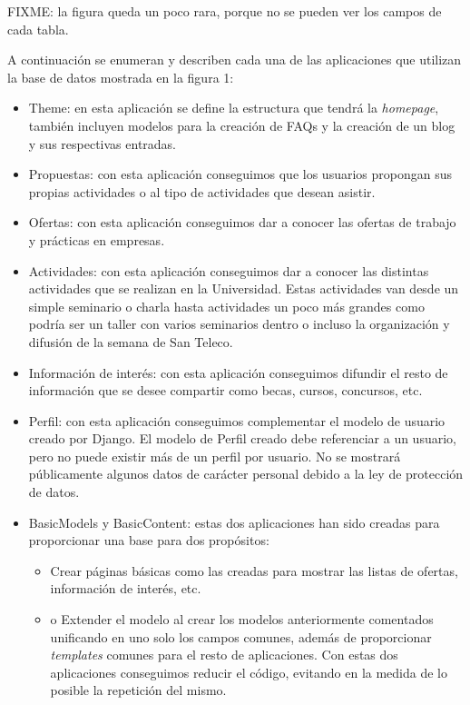 FIXME: la figura queda un poco rara, porque no se pueden ver los campos de cada tabla.
 

A continuación se enumeran y describen cada una de las aplicaciones que utilizan la base de datos mostrada en la figura 1:


\begin{itemize}
\item Theme: en esta aplicación se define la estructura que tendrá la \textit{homepage}, también incluyen modelos para la creación de FAQs y la creación de un blog y sus respectivas entradas.
\item Propuestas: con esta aplicación conseguimos que los usuarios propongan sus propias actividades o al tipo de actividades que desean asistir.
\item Ofertas: con esta aplicación conseguimos dar a conocer las ofertas de trabajo y prácticas en empresas.
\item Actividades: con esta aplicación conseguimos dar a conocer las distintas actividades que se realizan en la Universidad. Estas actividades van desde un simple seminario o charla hasta actividades un poco más grandes como podría ser un taller con varios seminarios dentro o incluso la organización y difusión de la semana de San Teleco. 
\item Información de interés: con esta aplicación conseguimos difundir el resto de información que se desee compartir como becas, cursos, concursos, etc. 
\item Perfil: con esta aplicación conseguimos complementar el modelo de usuario creado por Django.
El modelo de Perfil creado debe referenciar a un usuario, pero no puede existir más de un perfil por usuario. 
No se mostrará públicamente algunos datos de carácter personal debido a la ley de protección de datos.
\item BasicModels y BasicContent: estas dos aplicaciones han sido creadas para proporcionar una base para dos propósitos:
\begin{itemize}
\item Crear páginas básicas como las creadas para mostrar las listas de ofertas, información de interés, etc.
\item o	Extender el modelo al crear los modelos anteriormente comentados unificando en uno solo los campos comunes, además de proporcionar \textit{templates} comunes para el resto de aplicaciones.
Con estas dos aplicaciones conseguimos reducir el código, evitando en la medida de lo posible la repetición del mismo.
\end{itemize}
\end{itemize}


